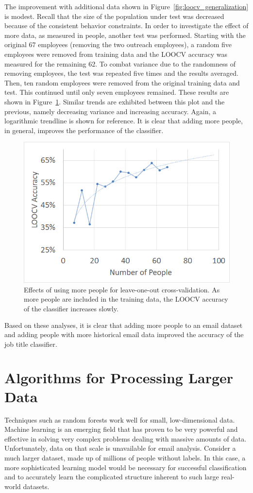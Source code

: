 \documentclass[12pt]{report}
\begin{document}
The improvement with additional data shown in Figure~\ref{fig:loocv_generalization} is modest.
Recall that the size of the population under test was decreased because of the consistent behavior constraints.
In order to investigate the effect of more data, as measured in people, another test was performed.
Starting with the original 67 employees (removing the two outreach employees), a random five employees were removed from training data and the LOOCV accuracy was measured for the remaining 62.
To combat variance due to the randomness of removing employees, the test was repeated five times and the results averaged.
Then, ten random employees were removed from the original training data and test.
This continued until only seven employees remained.
These results are shown in Figure~\ref{fig:people_generalization}.
Similar trends are exhibited between this plot and the previous, namely decreasing variance and increasing accuracy.
Again, a logarithmic trendline is shown for reference.
It is clear that adding more people, in general, improves the performance of the classifier.
\begin{figure}[t]
    \centering
        \includegraphics[width=.7\columnwidth,trim={0mm 0mm 0mm 0mm},clip]{Num_of_people_LOOCV}
        \vspace{-7pt}
        \caption[Effects of more people on prediction accuracy]{Effects of using more people for leave-one-out cross-validation.  As more people are included in the training data, the LOOCV accuracy of the classifier increases slowly.}
        \label{fig:people_generalization}
\end{figure}

Based on these analyses, it is clear that adding more people to an email dataset and adding people with more historical email data improved the accuracy of the job title classifier.

\section{Algorithms for Processing Larger Data}
Techniques such as random forests work well for small, low-dimensional data.
Machine learning is an emerging field that has proven to be very powerful and effective in solving very complex problems dealing with massive amounts of data.
Unfortunately, data on that scale is unavailable for email analysis.
Consider a much larger dataset, made up of millions of people without labels.
In this case, a more sophisticated learning model would be necessary for successful classification and to accurately learn the complicated structure inherent to such large real-world datasets.
\end{document}

